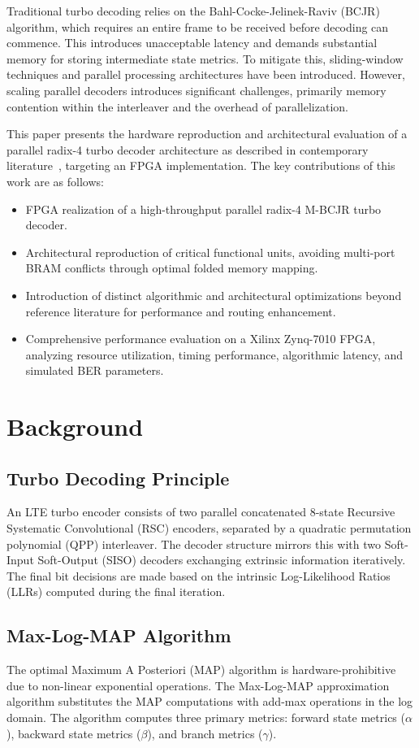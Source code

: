 \documentclass[conference]{IEEEtran}
\begin{document}
Traditional turbo decoding relies on the Bahl-Cocke-Jelinek-Raviv (BCJR) algorithm, which requires an entire frame to be received before decoding can commence. This introduces unacceptable latency and demands substantial memory for storing intermediate state metrics. To mitigate this, sliding-window techniques and parallel processing architectures have been introduced. However, scaling parallel decoders introduces significant challenges, primarily memory contention within the interleaver and the overhead of parallelization.

This paper presents the hardware reproduction and architectural evaluation of a parallel radix-4 turbo decoder architecture as described in contemporary literature~\cite{studer2011}, targeting an FPGA implementation. The key contributions of this work are as follows:
\begin{itemize}
    \item FPGA realization of a high-throughput parallel radix-4 M-BCJR turbo decoder.
    \item Architectural reproduction of critical functional units, avoiding multi-port BRAM conflicts through optimal folded memory mapping.
    \item Introduction of distinct algorithmic and architectural optimizations beyond reference literature for performance and routing enhancement.
    \item Comprehensive performance evaluation on a Xilinx Zynq-7010 FPGA, analyzing resource utilization, timing performance, algorithmic latency, and simulated BER parameters.
\end{itemize}

\section{Background}
\subsection{Turbo Decoding Principle}
An LTE turbo encoder consists of two parallel concatenated 8-state Recursive Systematic Convolutional (RSC) encoders, separated by a quadratic permutation polynomial (QPP) interleaver. The decoder structure mirrors this with two Soft-Input Soft-Output (SISO) decoders exchanging extrinsic information iteratively. The final bit decisions are made based on the intrinsic Log-Likelihood Ratios (LLRs) computed during the final iteration.

\subsection{Max-Log-MAP Algorithm}
The optimal Maximum A Posteriori (MAP) algorithm is hardware-prohibitive due to non-linear exponential operations. The Max-Log-MAP approximation algorithm substitutes the MAP computations with add-max operations in the log domain. The algorithm computes three primary metrics: forward state metrics ($\alpha$), backward state metrics ($\beta$), and branch metrics ($\gamma$).
\end{document}
